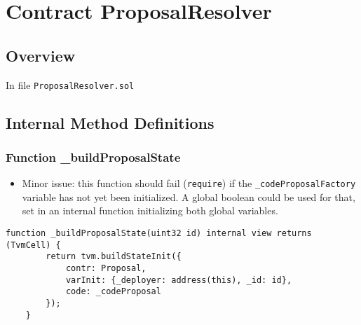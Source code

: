 
\chapter{Contract ProposalResolver}

\minitoc

\section{Overview}

In file {\tt ProposalResolver.sol}

\section{Internal Method Definitions}


\subsection{Function \_{}buildProposalState}

\begin{itemize}
\item Minor issue: this function should fail ({\tt require}) if the
  {\tt \_codeProposalFactory} variable has not yet been initialized. A global
  boolean could be used for that, set in an internal function
  initializing both global variables.
\end{itemize}

\begin{lstlisting}[firstnumber=14]
    function _buildProposalState(uint32 id) internal view returns (TvmCell) {
        return tvm.buildStateInit({
            contr: Proposal,
            varInit: {_deployer: address(this), _id: id},
            code: _codeProposal
        });
    }
\end{lstlisting}
